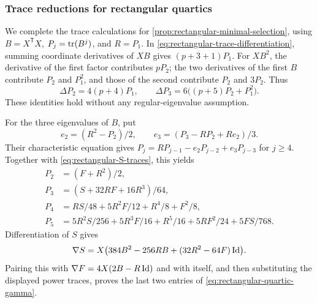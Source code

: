 \subsubsection{Trace reductions for rectangular quartics}
\label{app:rectangular-trace-details}

We complete the trace calculations for
\cref{prop:rectangular-minimal-selection}, using
$B=X^{\mathsf T}X$, $P_j=\operatorname{tr}(B^j)$, and $R=P_1$.
In \eqref{eq:rectangular-trace-differentiation}, summing coordinate
derivatives of $XB$ gives $(p+3+1)P_1$. For $XB^2$, the derivative
of the first factor contributes $pP_2$; the two derivatives of the
first $B$ contribute $P_2$ and $P_1^2$, and those of the second
contribute $P_2$ and $3P_2$. Thus
\[
 \Delta P_2=4(p+4)P_1,\qquad
 \Delta P_3=6\bigl((p+5)P_2+P_1^2\bigr).
\]
These identities hold without any regular-eigenvalue assumption.

For the three eigenvalues of $B$, put
\[
 e_2=(R^2-P_2)/2,\qquad
 e_3=(P_3-RP_2+Re_2)/3.
\]
Their characteristic equation gives
$P_j=RP_{j-1}-e_2P_{j-2}+e_3P_{j-3}$ for $j\ge4$.
Together with \eqref{eq:rectangular-S-traces}, this yields
\begin{align*}
 P_2&=(F+R^2)/2,\\
 P_3&=(S+32RF+16R^3)/64,\\
 P_4&=RS/48+5R^2F/12+R^4/8+F^2/8,\\
 P_5&=5R^2S/256+5R^3F/16+R^5/16
                 +5RF^2/24+5FS/768.
\end{align*}
Differentiation of $S$ gives
\[
 \nabla S=X\bigl(384B^2-256RB+(32R^2-64F)\operatorname{Id}\bigr).
\]
Pairing this with $\nabla F=4X(2B-R\operatorname{Id})$ and with itself, and then
substituting the displayed power traces, proves the last two entries
of \eqref{eq:rectangular-quartic-gamma}.
